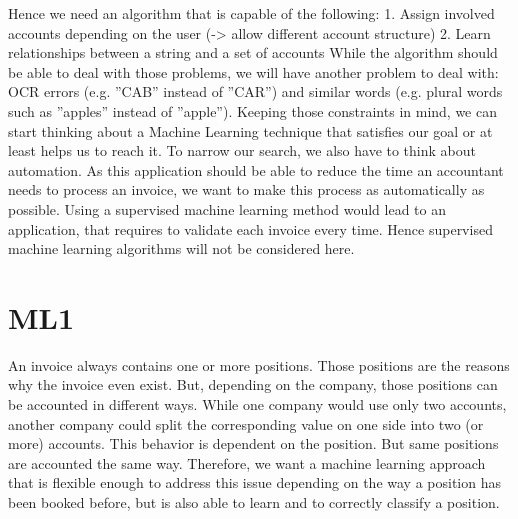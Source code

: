 Hence we need an algorithm that is capable of the following:
1.	Assign involved accounts depending on the user (-> allow different account structure)
2.	Learn relationships between a string and a set of accounts
While the algorithm should be able to deal with those problems, we will have another problem to deal with: OCR errors (e.g. ''CAB'' instead of ''CAR'')  and similar words (e.g. plural words such as ''apples'' instead of ''apple''). 
Keeping those constraints in mind, we can start thinking about a Machine Learning technique that satisfies our goal or at least helps us to reach it.
To narrow our search, we also have to think about automation. As this application should be able to reduce the time an accountant needs to process an invoice, we want to make this process as automatically as possible. Using a supervised machine learning method would lead to an application, that requires to validate each invoice every time. Hence supervised machine learning algorithms will not be considered here.


\section{ML1}
\label{Naive Bayes on accounting records}

An invoice always contains one or more positions. Those positions are the reasons why the invoice even exist. But, depending on the company, those positions can be accounted in different ways. While one company would use only two accounts, another company could split the corresponding value on one side into two (or more) accounts.
This behavior is dependent on the position. But same positions are accounted the same way. Therefore, we want a machine learning approach that is flexible enough to address this issue depending on the way a position has been booked before, but is also able to learn and to correctly classify a position.

